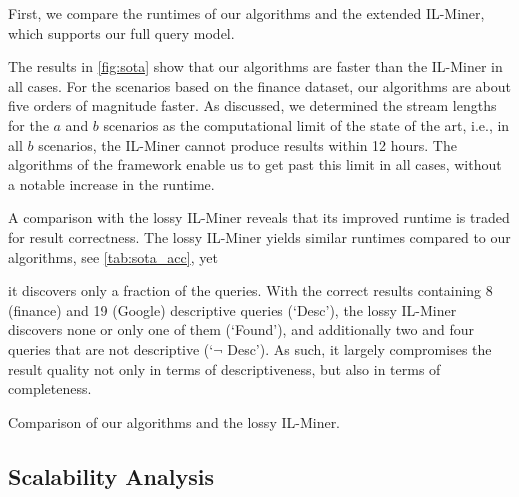 First, we compare the runtimes of our algorithms and the
extended IL-Miner, which supports our full query model.

The results in \autoref{fig:sota} show that our algorithms are faster than
the IL-Miner in all cases. For the scenarios based on the finance dataset,
our algorithms are about five orders of magnitude faster. As discussed, we
determined the stream lengths for the $a$ and $b$ scenarios as the
computational limit of the state of the art, i.e., in all $b$ scenarios, the
IL-Miner cannot produce results within 12 hours. The algorithms of the
\sys{} framework enable us to get past this limit in all cases, without a
notable increase in the runtime.

A comparison with the lossy IL-Miner reveals that its improved runtime is traded
for result correctness. The lossy
IL-Miner yields similar runtimes compared to our algorithms, see
\autoref{tab:sota_acc}, yet

it discovers
only a fraction of the queries. With the correct results containing 8
(finance) and 19 (Google) descriptive queries (`Desc'), the lossy IL-Miner
discovers none or only one of them (`Found'), and additionally two and four
queries that are not descriptive (`$\neg$ Desc'). As such, it largely compromises
the result quality not only in terms of descriptiveness, but also in terms of
completeness.



\begin{table}
	\footnotesize
	\caption{Comparison of our algorithms and the lossy IL-Miner.}
	\vspace{-1.2em}
	\label{tab:sota_acc}
	
	\vspace{-1.5em}
\end{table}





\subsection{Scalability Analysis}







